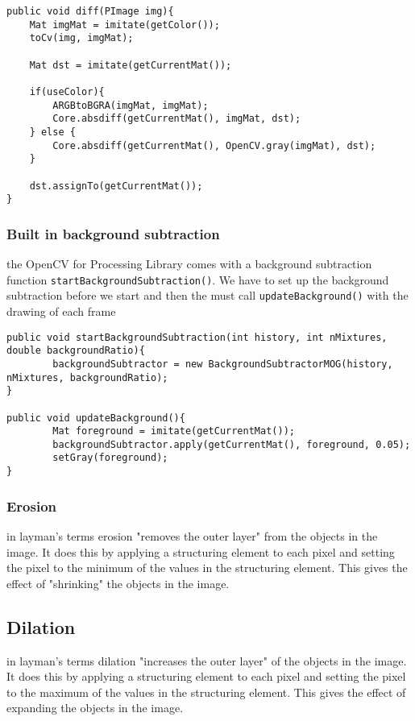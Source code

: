 \documentclass[a4paper]{report}
\begin{document}
\begin{lstlisting}
public void diff(PImage img){
	Mat imgMat = imitate(getColor());
	toCv(img, imgMat);

	Mat dst = imitate(getCurrentMat());

	if(useColor){
		ARGBtoBGRA(imgMat, imgMat);
		Core.absdiff(getCurrentMat(), imgMat, dst);
	} else {
		Core.absdiff(getCurrentMat(), OpenCV.gray(imgMat), dst);
	}
		
	dst.assignTo(getCurrentMat());
}
\end{lstlisting}

\subsubsection{Built in background subtraction}
the OpenCV for Processing Library comes with a background subtraction function \verb|startBackgroundSubtraction()|. We have to set up the background subtraction before we start and then the must call \verb|updateBackground()| with the drawing of each frame

\begin{lstlisting}
public void startBackgroundSubtraction(int history, int nMixtures, double backgroundRatio){
		backgroundSubtractor = new BackgroundSubtractorMOG(history, nMixtures, backgroundRatio);
}
	
public void updateBackground(){
		Mat foreground = imitate(getCurrentMat());
		backgroundSubtractor.apply(getCurrentMat(), foreground, 0.05);
		setGray(foreground);
}
\end{lstlisting}

\subsubsection{Erosion}
in layman's terms erosion "removes the outer layer" from the objects in the image. It does this by applying a structuring element to each pixel and setting the pixel to the minimum of the values in the structuring element. This gives the effect of "shrinking" the objects in the image.

\subsection{Dilation}
in layman's terms dilation "increases the outer layer" of the objects in the image. It does this by applying a structuring element to each pixel and setting the pixel to the maximum of the values in the structuring element. This gives the effect of expanding the objects in the image.
\end{document}
